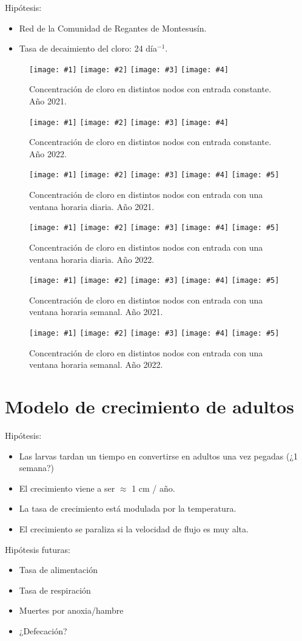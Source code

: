 \documentclass[a4paper]{article}
\newcommand{\FIGIV}[6]
{
	\begin{figure}[ht!]
		\centering
		\texttt{[image: \#1]}
		\texttt{[image: \#2]}
		\texttt{[image: \#3]}
		\texttt{[image: \#4]}
		\caption{#5.\label{#6}}
	\end{figure}
}
\newcommand{\FIGV}[7]
{
	\begin{figure}[ht!]
		\centering
		\texttt{[image: \#1]}
		\texttt{[image: \#2]}
		\texttt{[image: \#3]}
		\texttt{[image: \#4]}
		\texttt{[image: \#5]}
		\caption{#6.\label{#7}}
	\end{figure}
}
\begin{document}
\clearpage
Hipótesis:
\begin{itemize}
\item Red de la Comunidad de Regantes de Montesusín.
\item Tasa de decaimiento del cloro: 24 día$^{-1}$.
\end{itemize}

\FIGIV{24-2021-chlorine-constant-0.eps}{24-2021-chlorine-constant-2.eps}
{24-2021-chlorine-constant-6665.eps}{24-2021-chlorine-constant-172.eps}
{Concentración de cloro en distintos nodos con entrada constante. Año 2021}
{Fig242021ChlorineConstant}

\FIGIV{24-2022-chlorine-constant-0.eps}{24-2022-chlorine-constant-2.eps}
{24-2022-chlorine-constant-68.eps}{24-2022-chlorine-constant-172.eps}
{Concentración de cloro en distintos nodos con entrada constante. Año 2022}
{Fig242022ChlorineConstant}

\FIGV{24-2021-chlorine-day-0.eps}{24-2021-chlorine-day-2.eps}
{24-2021-chlorine-day-65.eps}{24-2021-chlorine-day-6665.eps}
{24-2021-chlorine-day-172.eps}
{Concentración de cloro en distintos nodos con entrada con una ventana horaria
diaria. Año 2021}{Fig242021ChlorineDay}

\FIGV{24-2022-chlorine-day-0.eps}{24-2022-chlorine-day-2.eps}
{24-2022-chlorine-day-6634.eps}{24-2022-chlorine-day-68.eps}
{24-2022-chlorine-day-172.eps}
{Concentración de cloro en distintos nodos con entrada con una ventana horaria
diaria. Año 2022}{Fig242022ChlorineDay}

\FIGV{24-2021-chlorine-week-0.eps}{24-2021-chlorine-week-2.eps}
{24-2021-chlorine-week-68.eps}{24-2021-chlorine-week-123.eps}
{24-2021-chlorine-week-172.eps}
{Concentración de cloro en distintos nodos con entrada con una ventana horaria
semanal. Año 2021}{Fig242021ChlorineWeek}

\FIGV{24-2022-chlorine-week-0.eps}{24-2022-chlorine-week-2.eps}
{24-2022-chlorine-week-6634.eps}{24-2022-chlorine-week-139.eps}
{24-2022-chlorine-week-172.eps}
{Concentración de cloro en distintos nodos con entrada con una ventana horaria
semanal. Año 2022}{Fig242022ChlorineWeek}

\clearpage
\section{Modelo de crecimiento de adultos}

Hipótesis:
\begin{itemize}
\item Las larvas tardan un tiempo en convertirse en adultos una vez pegadas
(¿1 semana?)
\item El crecimiento viene a ser $\approx$ 1 cm / año.
\item La tasa de crecimiento está modulada por la temperatura.
\item El crecimiento se paraliza si la velocidad de flujo es muy alta.
\end{itemize}

Hipótesis futuras:
\begin{itemize}
\item Tasa de alimentación
\item Tasa de respiración
\item Muertes por anoxia/hambre
\item ¿Defecación?
\end{itemize}
\end{document}

